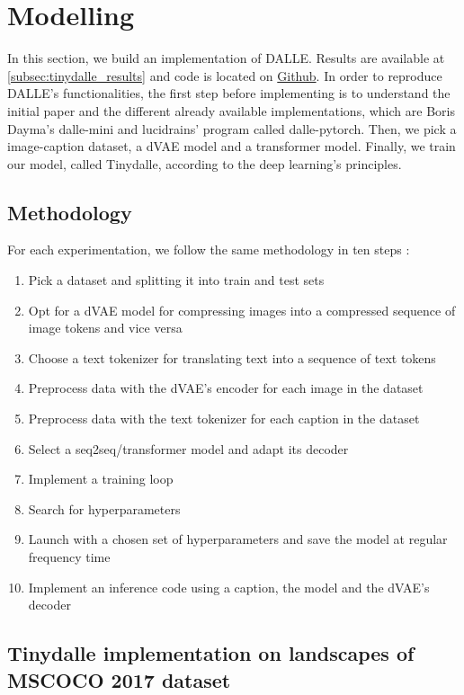 \documentclass{article}
\begin{document}
\pagebreak

\section{Modelling}

In this section, we build an implementation of DALLE. Results are available at \ref{subsec:tinydalle_results} and code is located on \href{https://github.com/cthiounn/dalle-tiny}{Github}. In order to reproduce DALLE's functionalities, the first step before implementing is to understand the initial paper and the different already available implementations, which are Boris Dayma's dalle-mini and lucidrains' program called dalle-pytorch. Then, we pick a image-caption dataset, a dVAE model and a transformer model. Finally, we train our model, called Tinydalle, according to the deep learning's principles.

\subsection{Methodology}

For each experimentation, we follow the same methodology in ten steps :

\begin{enumerate}
\item Pick a dataset and splitting it into train and test sets
    \item Opt for a dVAE model for compressing images into a compressed sequence of image tokens and vice versa
    \item Choose a text tokenizer for translating text into a sequence of text tokens
    \item Preprocess data with the dVAE's encoder for each image in the dataset
    \item Preprocess data with the text tokenizer for each caption in the dataset
    \item Select a seq2seq/transformer model and adapt its decoder
    \item Implement a training loop
    \item Search for hyperparameters
    \item Launch with a chosen set of hyperparameters and save the model at regular frequency time
    \item Implement an inference code using a caption, the model and the dVAE's decoder
\end{enumerate}

\subsection{Tinydalle implementation on landscapes of MSCOCO 2017 dataset}
\end{document}
